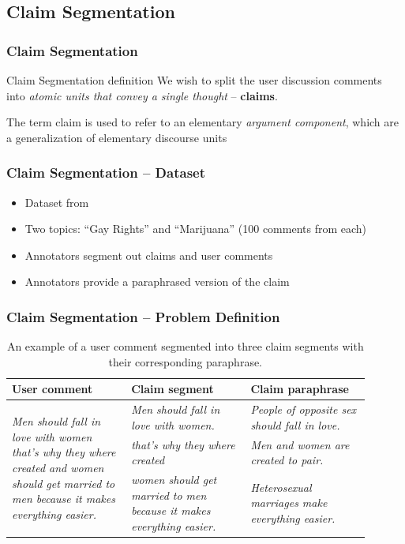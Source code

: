 \documentclass{beamer}
\begin{document}
\subsection{Claim Segmentation}
\begin{frame}
\frametitle{Claim Segmentation}
\begin{block}{Claim Segmentation definition}
We wish to split the user discussion comments into \emph{atomic units
that convey a single thought} -- \textbf{claims}.

\end{block}

\vspace{0.5cm}
The term claim is used to refer to an elementary \emph{argument component}, 
which are a generalization of elementary discourse units
\cite{winter1982towards, givon1983topic, polanyi1996linguistic}
	
\end{frame}

\begin{frame}
	\frametitle{Claim Segmentation -- Dataset}

	\begin{itemize}
		\item Dataset from \cite{hasan2014you}
		\item Two topics: ``Gay Rights'' and ``Marijuana'' (100 comments from each)
		\item Annotators segment out claims and user comments
		\item Annotators provide a paraphrased version of the claim
	\end{itemize}

\end{frame}

\begin{frame}
\frametitle{Claim Segmentation -- Problem Definition}

\begin{table}[t]
\begin{center}
{\footnotesize
	\begin{tabular}{@{}p{0.3\linewidth} p{0.30\linewidth} p{0.30\linewidth} }
\toprule
\textbf{User comment} & \textbf{Claim segment} & \textbf{Claim paraphrase}   \\
\midrule
\multirow{3}{*}{\parbox{3cm}{
		\emph{Men should fall in love with women that's why they where
		created and women should get married to men because it makes
		everything easier. }
}}
&  
\emph{Men should fall in love with women.}
& \emph{People of opposite sex should fall in love.}
\\
\cmidrule{2-3}
& \emph{that's why they where created} & \emph{Men and women are created to pair.}
 \\
\cmidrule{2-3}
& \emph{women should get married to men because it makes everything easier.} & 
 \emph{Heterosexual marriages make everything easier.}
 \\
 \bottomrule
\end{tabular}}
\end{center}
\caption{An example of a user comment segmented into three claim segments with
	their corresponding paraphrase.}
\end{table}

\end{frame}
\end{document}
